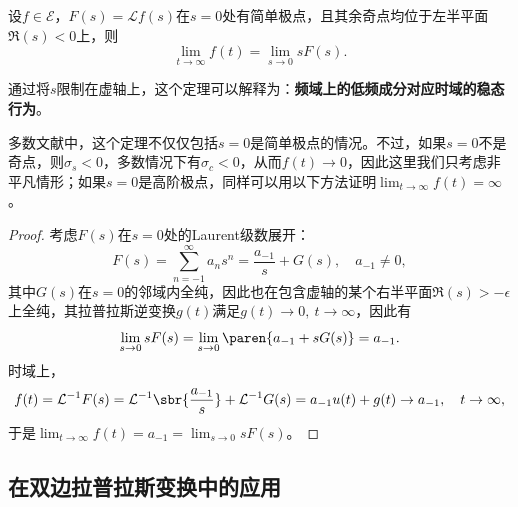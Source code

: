 \begin{theorem}[终值定理]
    \label{thm:final_value}
    设$f\in\mathcal{E}$，$F(s)=\mathcal{L}f(s)$在$s=0$处有简单极点，且其余奇点均位于左半平面$\Re(s)<0$上，则
    \begin{equation}
        \lim_{t\to\infty}f(t)=\lim_{s\to 0}sF(s).
    \end{equation}
\end{theorem}
通过将$s$限制在虚轴上，这个定理可以解释为：\textbf{频域上的低频成分对应时域的稳态行为}。
\begin{remark}
    多数文献中，这个定理不仅仅包括$s=0$是简单极点的情况。不过，如果$s=0$不是奇点，则$\sigma_s<0$，多数情况下有$\sigma_c<0$，从而$f(t)\to 0$，因此这里我们只考虑非平凡情形；如果$s=0$是高阶极点，同样可以用以下方法证明$\lim_{t\to\infty}f(t)=\infty$。
\end{remark}
\begin{proof}
    考虑$F(s)$在$s=0$处的Laurent级数展开：
    \begin{equation}
        F(s)=\sum_{n=-1}^{\infty}a_n s^n=\frac{a_{-1}}{s}+G(s),\quad a_{-1}\neq 0,
    \end{equation}
    其中$G(s)$在$s=0$的邻域内全纯，因此也在包含虚轴的某个右半平面$\Re(s)>-\epsilon$上全纯，其拉普拉斯逆变换$g(t)$满足$g(t)\to 0,\ t\to\infty$，因此有
    \begin{equation}
        \lim_{s\to 0}sF(s)=\lim_{s\to 0}\paren{a_{-1}+sG(s)}=a_{-1}.
    \end{equation}
    时域上，
    \begin{equation}
        f(t)=\mathcal{L}^{-1}F(s)=\mathcal{L}^{-1}\sbr{\frac{a_{-1}}{s}}+\mathcal{L}^{-1}G(s)=a_{-1}u(t)+g(t)\to a_{-1},\quad t\to\infty,
    \end{equation}
    于是$\lim_{t\to\infty}f(t)=a_{-1}=\lim_{s\to 0}sF(s)$。
\end{proof}

\subsection{在双边拉普拉斯变换中的应用}\label{sub:bilateral_laplace}

